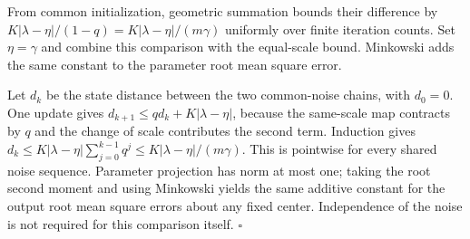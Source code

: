 \documentclass[11pt,a4paper]{report}
\begin{document}
From common initialization, geometric summation bounds their difference by \(K|\lambda-\eta|/(1-q)=K|\lambda-\eta|/(m\gamma)\) uniformly over finite iteration counts. Set \(\eta=\gamma\) and combine this comparison with the equal-scale bound. Minkowski adds the same constant to the parameter root mean square error.




Let \(d_k\) be the state distance between the two common-noise chains, with \(d_0=0\). One update gives \(d_{k+1}\le qd_k+K|\lambda-\eta|\), because the same-scale map contracts by \(q\) and the change of scale contributes the second term. Induction gives \(d_k\le K|\lambda-\eta|\sum_{j=0}^{k-1}q^j\le K|\lambda-\eta|/(m\gamma)\). This is pointwise for every shared noise sequence. Parameter projection has norm at most one; taking the root second moment and using Minkowski yields the same additive constant for the output root mean square errors about any fixed center. Independence of the noise is not required for this comparison itself. \(\square\)
\end{document}
